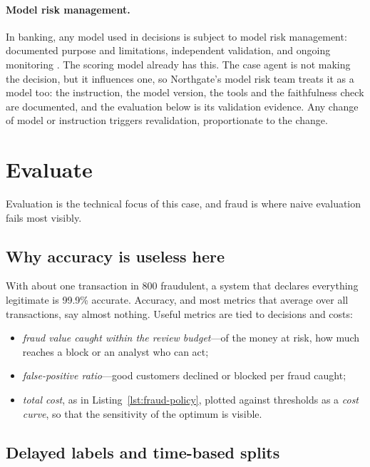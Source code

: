 \paragraph{Model risk management.} In banking, any model used in decisions is subject to model risk management: documented purpose and limitations, independent validation, and ongoing monitoring \citep{fed2011sr117}. The scoring model already has this. The case agent is not making the decision, but it influences one, so Northgate's model risk team treats it as a model too: the instruction, the model version, the tools and the faithfulness check are documented, and the evaluation below is its validation evidence. Any change of model or instruction triggers revalidation, proportionate to the change.

\section{Evaluate}
\label{sec:fr-evaluate}

Evaluation is the technical focus of this case, and fraud is where naive evaluation fails most visibly.

\subsection{Why accuracy is useless here}

With about one transaction in 800 fraudulent, a system that declares everything legitimate is 99.9\% accurate. Accuracy, and most metrics that average over all transactions, say almost nothing. Useful metrics are tied to decisions and costs:
\begin{itemize}[itemsep=1pt]
  \item \emph{fraud value caught within the review budget}---of the money at risk, how much reaches a block or an analyst who can act;
  \item \emph{false-positive ratio}---good customers declined or blocked per fraud caught;
  \item \emph{total cost}, as in Listing~\ref{lst:fraud-policy}, plotted against thresholds as a \emph{cost curve}, so that the sensitivity of the optimum is visible.
\end{itemize}

\subsection{Delayed labels and time-based splits}

